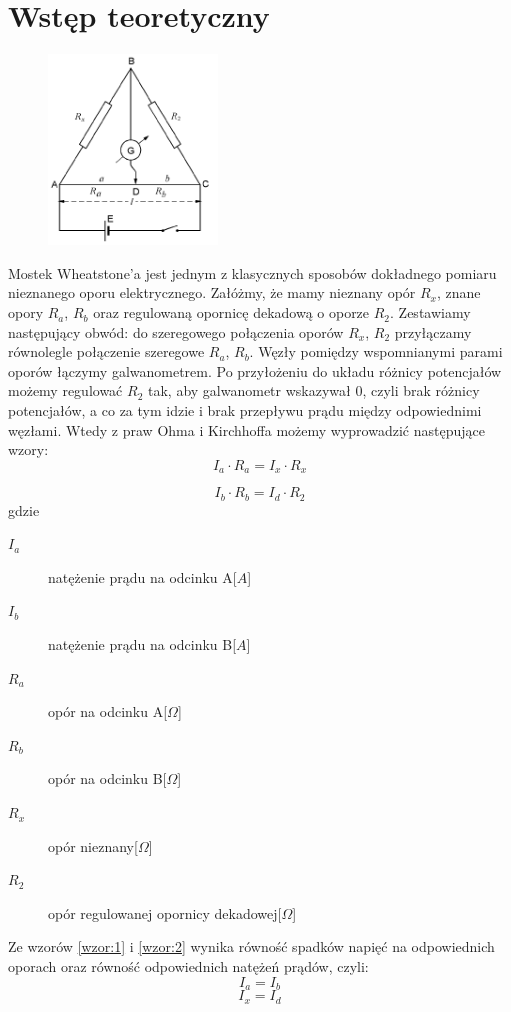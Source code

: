 \documentclass[a4paper,11pt]{article}
\begin{document}
\section{Wstęp teoretyczny}
\begin{figure}
\label{rys:1}
\vspace*{-0.5cm}
\includegraphics[width=0.4\textwidth]{./schemat}
\end{figure}
\indent Mostek Wheatstone’a jest jednym z klasycznych sposobów dokładnego pomiaru nieznanego oporu elektrycznego. Załóżmy, że mamy nieznany opór $R_x$, znane opory $R_a$, $R_b$ oraz regulowaną opornicę dekadową o oporze $R_2$. Zestawiamy następujący obwód: do szeregowego połączenia oporów $R_x$, $R_2$ przyłączamy równolegle połączenie szeregowe $R_a$, $R_b$. Węzły pomiędzy wspomnianymi parami oporów łączymy galwanometrem. Po przyłożeniu do układu różnicy potencjałów możemy regulować $R_2$ tak, aby galwanometr wskazywał 0, czyli brak różnicy potencjałów, a co za tym idzie i brak przepływu prądu między odpowiednimi węzłami. Wtedy z praw Ohma i Kirchhoffa możemy wyprowadzić następujące wzory: 
\begin{equation}
\label{wzor:1}
I_a\cdot R_a=I_x\cdot R_x
\end{equation}

\begin{equation}
\label{wzor:2}
I_b\cdot R_b=I_d\cdot R_2
\end{equation}
gdzie
\begin{description}
\item [$I_{a}$] natężenie prądu na odcinku A[$A$]
\item [$I_{b}$] natężenie prądu na odcinku B[$A$]
\item [$R_{a}$] opór na odcinku A[$\Omega$]
\item [$R_{b}$] opór na odcinku B[$\Omega$]
\item [$R_{x}$] opór nieznany[$\Omega$]
\item [$R_{2}$] opór regulowanej opornicy dekadowej[$\Omega$]
\end{description}
\indent Ze wzorów {\ref{wzor:1}} i {\ref{wzor:2}} wynika równość spadków napięć na odpowiednich oporach oraz równość odpowiednich natężeń prądów, czyli:
$$I_a=I_b$$
$$I_x=I_d$$
\end{document}
